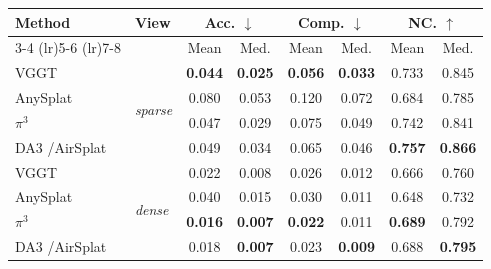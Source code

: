 \setlength{\tabcolsep}{7pt}
\begin{tabular}{ll cccccc}
\toprule
\multirow{2}{*}{\textbf{Method}} & \multirow{2}{*}{\textbf{View}} & \multicolumn{2}{c}{Acc. $\downarrow$} & \multicolumn{2}{c}{Comp. $\downarrow$} & \multicolumn{2}{c}{NC. $\uparrow$} \\
\cmidrule(lr){3-4} \cmidrule(lr){5-6} \cmidrule(lr){7-8}
& & Mean & Med. & Mean & Med. & Mean & Med. \\
\midrule
VGGT~\cite{wang2025vggt} & \multirow{4}{*}{\textit{sparse}} & \textbf{0.044} & \textbf{0.025} & \textbf{0.056} & \textbf{0.033} & 0.733 & 0.845 \\
AnySplat~\cite{jiang2025anysplat} & & 0.080 & 0.053 & 0.120 & 0.072 & 0.684 & 0.785 \\
$\pi^3$~\cite{wang2025pi3}& & 0.047 & 0.029 & 0.075 & 0.049 & 0.742 & 0.841 \\
DA3 \cite{lin2025da3}/AirSplat & & 0.049 & 0.034 & 0.065 & 0.046 & \textbf{0.757} & \textbf{0.866} \\
\midrule
VGGT~\cite{wang2025vggt} & \multirow{4}{*}{\textit{dense}} & 0.022 & 0.008 & 0.026 & 0.012 & 0.666 & 0.760 \\
AnySplat~\cite{jiang2025anysplat} & & 0.040 & 0.015 & 0.030 & 0.011 & 0.648 & 0.732 \\
$\pi^3$~\cite{wang2025pi3}& & \textbf{0.016} & \textbf{0.007} & \textbf{0.022} & 0.011 & \textbf{0.689} & 0.792 \\
DA3 \cite{lin2025da3}/AirSplat & & 0.018 & \textbf{0.007} & 0.023 & \textbf{0.009} & 0.688 & \textbf{0.795} \\
\bottomrule
\end{tabular}